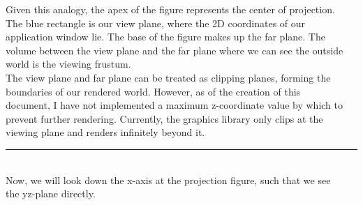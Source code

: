 \documentclass[11.pt]{article}
\begin{document}
Given this analogy, the apex of the figure represents the center of projection.\\
The blue rectangle is our view plane, where the 2D coordinates of our\\
application window lie. The base of the figure makes up the far plane. The\\
volume between the view plane and the far plane where we can see the outside\\
world is the viewing frustum.\\

The view plane and far plane can be treated as clipping planes, forming the\\
boundaries of our rendered world. However, as of the creation of this\\
document, I have not implemented a maximum z-coordinate value by which to\\
prevent further rendering. Currently, the graphics library only clips at the\\
viewing plane and renders infinitely beyond it.\\

\rule{12cm}{0.4pt}
\\

Now, we will look down the x-axis at the projection figure, such that we see\\
the yz-plane directly.\\

\end{document}
